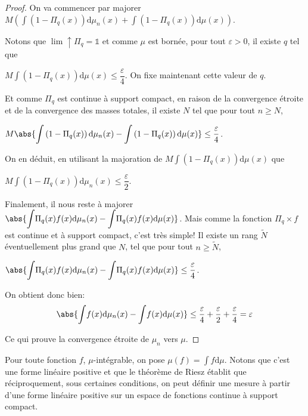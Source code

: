 \begin{proof}
On va commencer par majorer $M \left(\displaystyle{\int} \left(1-\Pi_q(x)\right) \mathrm d \mu_n(x) + \displaystyle{\int} \left(1-\Pi_q(x)\right)\mathrm d \mu(x)\right)$.

Notons que $\lim \uparrow \Pi_q = \mathbb{1}$ et comme $\mu$ est bornée, pour tout $\varepsilon>0$, il existe $q$ tel que 

$M  \displaystyle{\int} \left(1-\Pi_q(x)\right)\mathrm d \mu(x) \leq \dfrac{\varepsilon}{4}$. On fixe maintenant cette valeur de $q$.

Et comme $\Pi_q$ est continue à support compact, en raison de la convergence étroite et de la convergence des masses totales, il existe $N$ tel que pour tout $n \geq N$,

$
M \abs{\displaystyle{\int} \left(1-\Pi_q(x)\right) \mathrm d \mu_n(x) - \displaystyle{\int} \left(1-\Pi_q(x)\right)\mathrm d \mu(x)} \leq \dfrac{\varepsilon}{4}
$.

On en déduit, en utilisant la majoration de $M  \displaystyle{\int} \left(1-\Pi_q(x)\right)\mathrm d \mu(x)$ que 

$M \displaystyle{\int} \left(1-\Pi_q(x)\right) \mathrm d \mu_n(x) \leq \dfrac{\varepsilon}{2}$.

Finalement, il nous reste à majorer $\abs{\displaystyle{\int} \Pi_q(x)f(x) \mathrm d \mu_n(x) - \displaystyle{\int} \Pi_q(x)f(x) \mathrm d \mu(x)}$. Mais comme la fonction $\Pi_q \times f$ est continue et à support compact, c'est très simple! Il existe un rang $\tilde{N}$ éventuellement plus grand que $N$, tel que pour tout $n \geq \tilde{N}$,

$\abs{\displaystyle{\int} \Pi_q(x) f(x) \mathrm d \mu_n(x) - \displaystyle{\int} \Pi_q(x) f(x) \mathrm d \mu(x)} \leq \dfrac{\varepsilon}{4}$.

On obtient donc bien:
\[
\abs{\displaystyle{\int} f(x) \mathrm d \mu_n(x) - \displaystyle{\int} f(x) \mathrm d \mu(x)} \leq \dfrac{\varepsilon}{4} + \dfrac{\varepsilon}{2} + \dfrac{\varepsilon}{4} = \varepsilon
\]

Ce qui prouve la convergence étroite de $\mu_n$ vers $\mu$.
\end{proof}

\begin{cerveau}
Pour toute fonction $f$, $\mu$-intégrable, on pose $\mu(f) = \int f \mathrm d \mu$. Notons que c'est une forme linéaire positive et que le théorème de Riesz établit que réciproquement, sous certaines conditions, on peut définir une mesure à partir d'une forme linéaire positive sur un espace de fonctions continue à support compact.
\end{cerveau}

